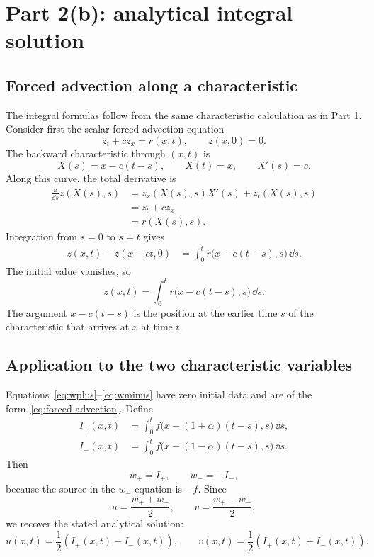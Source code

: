 \clearpage
\section{Part 2(b): analytical integral solution}

\subsection{Forced advection along a characteristic}

The integral formulas follow from the same characteristic calculation as in
Part 1. Consider first the scalar forced advection equation
\begin{equation}
 z_t+c z_x=r(x,t),
 \qquad z(x,0)=0.
 \label{eq:forced-advection}
\end{equation}
The backward characteristic through $(x,t)$ is
\begin{equation}
 X(s)=x-c(t-s),
 \qquad X(t)=x,
 \qquad X'(s)=c.
\end{equation}
Along this curve, the total derivative is
\begin{align}
 \frac{\dd}{\dd s}z(X(s),s)
 &=z_x(X(s),s)X'(s)+z_t(X(s),s)\\
 &=z_t+c z_x\\
 &=r(X(s),s).
\end{align}
Integration from $s=0$ to $s=t$ gives
\begin{align}
 z(x,t)-z(x-ct,0)
 &=\int_0^t r\bigl(x-c(t-s),s\bigr)\,\dd s.
\end{align}
The initial value vanishes, so
\begin{equation}
 \boxed{z(x,t)=\int_0^t r\bigl(x-c(t-s),s\bigr)\,\dd s.}
 \label{eq:duhamel-characteristic}
\end{equation}
The argument $x-c(t-s)$ is the position at the earlier time $s$ of the
characteristic that arrives at $x$ at time $t$.

\subsection{Application to the two characteristic variables}

Equations~\eqref{eq:wplus}--\eqref{eq:wminus} have zero initial data and are
of the form~\eqref{eq:forced-advection}. Define
\begin{align}
 I_+(x,t)
 &=\int_0^t f\bigl(x-(1+\alpha)(t-s),s\bigr)\,\dd s,\\
 I_-(x,t)
 &=\int_0^t f\bigl(x-(1-\alpha)(t-s),s\bigr)\,\dd s.
\end{align}
Then
\begin{equation}
 w_+=I_+,
 \qquad
 w_-=-I_-,
\end{equation}
because the source in the $w_-$ equation is $-f$. Since
\[
 u=\frac{w_++w_-}{2},
 \qquad
 v=\frac{w_+-w_-}{2},
\]
we recover the stated analytical solution:
\begin{equation}
 \boxed{
 u(x,t)=\frac12\left(I_+(x,t)-I_-(x,t)\right),
 \qquad
 v(x,t)=\frac12\left(I_+(x,t)+I_-(x,t)\right).}
 \label{eq:part2-analytical}
\end{equation}

